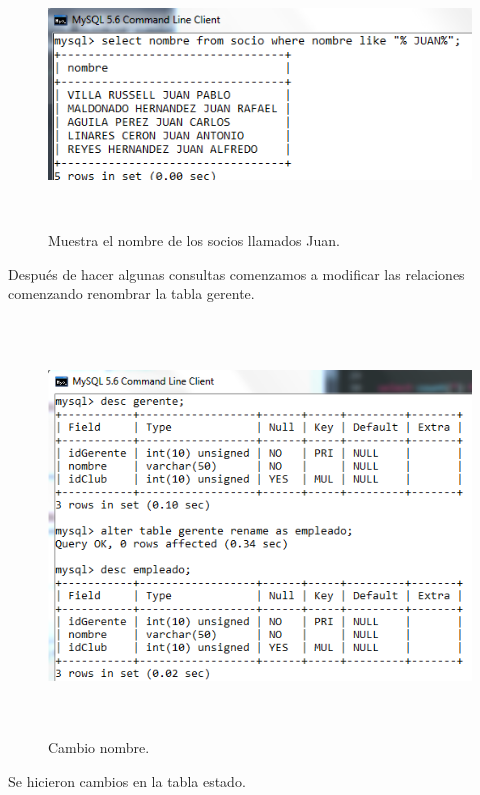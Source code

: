\documentclass[12pt, titlepage]{article}
\begin{document}
\begin{figure}[H]
    \begin{center}
        \includegraphics[width=14cm, height=7cm]{img/juan.png}
        \caption{Muestra el nombre de los socios llamados Juan.}
        \label{fig:arlter10}
    \end{center}
\end{figure}
Después de hacer algunas consultas comenzamos a modificar las relaciones comenzando renombrar la tabla gerente.
\begin{figure}[H]
    \begin{center}
        \includegraphics[width=14cm, height=11cm]{img/nombre.png}
        \caption{Cambio nombre.}
        \label{fig:arlter77}
    \end{center}
\end{figure}
Se hicieron cambios en la tabla estado.
\end{document}
